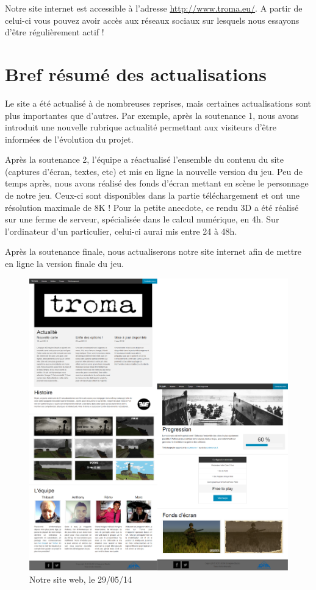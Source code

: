 \documentclass[11pt]{report}
\begin{document}
Notre site internet est accessible à l'adresse \url{http://www.troma.eu/}. A partir de celui-ci vous pouvez avoir accès aux réseaux sociaux sur lesquels nous essayons d'être régulièrement actif !

\section{Bref résumé des actualisations}

Le site a été actualisé à de nombreuses reprises, mais certaines actualisations sont plus importantes que d'autres. Par exemple, après la soutenance 1, nous avons introduit une nouvelle rubrique actualité permettant aux visiteurs d'être informées de l'évolution du projet.

Après la soutenance 2, l'équipe a réactualisé l'ensemble du contenu du site (captures d'écran, textes, etc) et mis en ligne la nouvelle version du jeu. Peu de temps après, nous avons réalisé des fonds d'écran mettant en scène le personnage de notre jeu. Ceux-ci sont disponibles dans la partie téléchargement et ont une résolution maximale de 8K ! Pour la petite anecdote, ce rendu 3D a été réalisé sur une ferme de serveur, spécialisée dans le calcul numérique, en 4h. Sur l'ordinateur d'un particulier, celui-ci aurai mis entre 24 à 48h.

Après la soutenance finale, nous actualiserons notre site internet afin de mettre en ligne la version finale du jeu.

\begin{figure}[htbp]
\centering
\includegraphics[width=13cm]{site_web.png}
\caption{Notre site web, le 29/05/14}
\end{figure}
\end{document}
